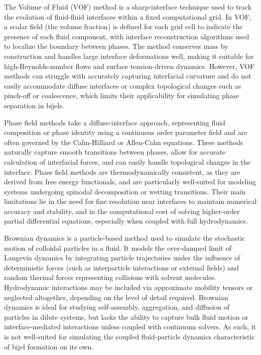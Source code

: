 The Volume of Fluid (VOF) method is a sharp-interface technique used to track the evolution of fluid-fluid interfaces within a fixed computational grid.
\cite{gopala_volume_2008, fleckenstein_volume-fluid-based_2015, deising_direct_2018}
In VOF, a scalar field (the volume fraction) is defined for each grid cell to indicate the presence of each fluid component, with interface reconstruction algorithms used to localize the boundary 
between phases. 
The method conserves mass by construction and handles large interface deformations well, making it suitable for high-Reynolds-number flows and surface tension-driven dynamics. However, 
VOF methods can struggle with accurately capturing interfacial curvature and do not easily accommodate diffuse interfaces or complex topological changes such as pinch-off or coalescence,
which limits their applicability for simulating phase separation in bijels.

Phase field methods take a diffuse-interface approach, representing fluid composition or phase identity using a continuous order parameter field and are often governed by the Cahn-Hilliard or 
Allen-Cahn equations. \cite{mendoza_evolution_2006, carmack_tuning_2018, chan_channel_2012}
These methods naturally capture smooth transitions between phases, allow for accurate calculation of interfacial forces, and can easily handle topological changes in the interface. 
Phase field methods are thermodynamically consistent, as they are derived from free energy functionals, and are particularly well-suited for modeling systems undergoing spinodal decomposition 
or wetting transitions. Their main limitations lie in the need for fine resolution near interfaces to maintain numerical accuracy and stability, and in the computational cost of solving 
higher-order partial differential equations, especially when coupled with full hydrodynamics.

Brownian dynamics is a particle-based method used to simulate the stochastic motion of colloidal particles in a fluid. 
\cite{huber_brownian_2019, yip_brownian_2005, elsawy_utility_2025}
It models the over-damped limit of Langevin dynamics by integrating particle 
trajectories under the influence of deterministic forces (such as interparticle interactions or external fields) and random thermal forces representing collisions with solvent molecules. Hydrodynamic 
interactions may be included via approximate mobility tensors or neglected altogether, depending on the level of detail required. Brownian dynamics is ideal for studying self-assembly, aggregation, 
and diffusion of particles in dilute systems, but lacks the ability to capture bulk fluid motion or interface-mediated interactions unless coupled with continuum solvers. As such, it is not well-suited 
for simulating the coupled fluid-particle dynamics characteristic of bijel formation on its own.

